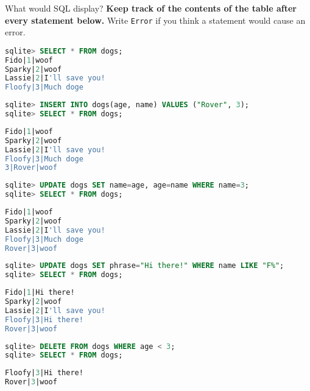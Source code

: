\question What would SQL display? \textbf{Keep track of the contents of
the table after every statement below.} Write \texttt{Error} if you think
a statement would cause an error.

\begin{lstlisting}[language=SQL]
sqlite> SELECT * FROM dogs;
Fido|1|woof
Sparky|2|woof
Lassie|2|I'll save you!
Floofy|3|Much doge
\end{lstlisting}

\begin{lstlisting}[language=SQL]
sqlite> INSERT INTO dogs(age, name) VALUES ("Rover", 3);
sqlite> SELECT * FROM dogs;
\end{lstlisting}
\begin{solution}[0.75in]
\begin{lstlisting}[language=SQL]
Fido|1|woof
Sparky|2|woof
Lassie|2|I'll save you!
Floofy|3|Much doge
3|Rover|woof
\end{lstlisting}
\end{solution}

\begin{lstlisting}[language=SQL]
sqlite> UPDATE dogs SET name=age, age=name WHERE name=3;
sqlite> SELECT * FROM dogs;
\end{lstlisting}
\begin{solution}[0.75in]
\begin{lstlisting}[language=SQL]
Fido|1|woof
Sparky|2|woof
Lassie|2|I'll save you!
Floofy|3|Much doge
Rover|3|woof
\end{lstlisting}
\end{solution}

\begin{lstlisting}[language=SQL]
sqlite> UPDATE dogs SET phrase="Hi there!" WHERE name LIKE "F%";
sqlite> SELECT * FROM dogs;
\end{lstlisting}
\begin{solution}[0.75in]
\begin{lstlisting}[language=SQL]
Fido|1|Hi there!
Sparky|2|woof
Lassie|2|I'll save you!
Floofy|3|Hi there!
Rover|3|woof
\end{lstlisting}
\end{solution}

\begin{lstlisting}[language=SQL]
sqlite> DELETE FROM dogs WHERE age < 3;
sqlite> SELECT * FROM dogs;
\end{lstlisting}
\begin{solution}[0.5in]
\begin{lstlisting}[language=SQL]
Floofy|3|Hi there!
Rover|3|woof
\end{lstlisting}
\end{solution}

